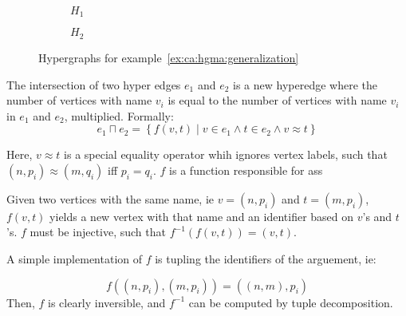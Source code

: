 \documentclass[../Master.tex]{subfiles}
\providecommand{\master}{..}
\begin{document}
\begin{example}
    \begin{figure}
        \centering
        \begin{subfigure}[b]{0.4\textwidth}
            \centering
            \resizebox{\linewidth}{!}{}
			\caption{$H_1$}
            \label{fig:ex:ca:hgma:ex:generalization1}
        \end{subfigure}%
        \hfill%
        \begin{subfigure}[b]{0.4\textwidth}
            \centering
            \resizebox{0.8\linewidth}{!}{}
            \caption{$H_2$}
            \label{fig:ex:ca:hgma:ex:generalization1}
        \end{subfigure}
		\caption{Hypergraphs for example~\ref{ex:ca:hgma:generalization}} 
    \end{figure}

\end{example}

\begin{definition}
    The intersection of two hyper edges $e_1$ and $e_2$ is a new hyperedge where the number of vertices with name $v_i$ is equal to the number of vertices with name $v_i$ in $e_1$ and $e_2$, multiplied. Formally:
    \begin{equation*}
        e_1 \sqcap e_2 = \left\{
            f(v, t) \; | \;
                v \in e_1 \land t \in e_2 \land v \approx t
        \right\}
    \end{equation*}

    Here, $v \approx t$ is a special equality operator whih ignores vertex labels, such that $\left( n, p_i \right) \approx \left( m, q_i \right)$ iff $p_i = q_i$. $f$ is a function responsible for ass
\end{definition}

\begin{definition}
    Given two vertices with the same name, ie $v = \left(n, p_i \right)$ and $t = \left( m, p_i \right)$, $f(v,t)$ yields a new vertex with that name and an identifier based on $v$'s and $t$'s. $f$ must be injective, such that $f^{-1}(f(v,t)) = (v,t)$.
\end{definition}

 A simple implementation of $f$ is tupling the identifiers of the arguement, ie:

\begin{equation*}
    f\left( \left(n, p_i \right), \left(m, p_i \right) \right) =
        \left( (n,m), p_i \right)
\end{equation*}
Then, $f$ is clearly inversible, and $f^{-1}$ can be computed by tuple decomposition.
\end{document}
